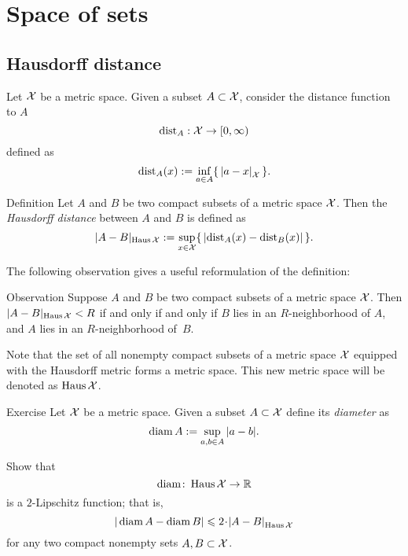 \chapter{Space of sets}

\section{Hausdorff distance}

Let $\mathcal{X}$ be a metric space.
Given a subset $A\subset \mathcal{X}$,
consider the distance function to $A$
$$\mathrm{dist}_A: \mathcal{X} \to [0,\infty)$$
defined as 
$$\distfun_A(x)
\df
\inf_{a\in A}\{\,\dist ax{\spc{X}}\,\}.$$

\begin{thm}{Definition}\label{def:hausdorff-convergence}
Let $A$ and $B$ be two compact subsets of a metric space $\mathcal{X}$.
Then the \emph{Hausdorff distance} between $A$ and $B$ is defined as 
$$|A-B|_{\operatorname{\rm Haus}\nolimits\mathcal{X}}
\mathrel{:=}
\sup_{x\in \mathcal{X}}\{\,|\mathrm{dist}_A(x)-\mathrm{dist}_B(x)|\,\}.
$$

\end{thm}

The following observation gives a useful reformulation of the definition:

\begin{thm}{Observation}\label{obs:Haus-nbhds}
Suppose $A$ and $B$ be two compact subsets of a metric space $\mathcal{X}$.
Then $|A-B|_{\operatorname{\rm Haus}\nolimits\mathcal{X}}< R$ if and only if and only if 
$B$ lies in an $R$-neighborhood of $A$, 
and 
$A$ lies in an $R$-neighborhood of~$B$.
\end{thm}



Note that the set of all nonempty compact subsets of a metric space $\mathcal{X}$ equipped with the Hausdorff metric forms a metric space.
This new metric space will be denoted as $\operatorname{\rm Haus}\nolimits\mathcal{X}$.

\begin{thm}{Exercise}\label{ex:diam}
Let $\mathcal{X}$ be a metric space.
Given a subset $A\subset \mathcal{X}$ define its \emph{diameter} as 
$$\operatorname{\rm diam}\nolimits A\mathrel{:=}\sup_{a,b\in A} |a-b|.$$

Show that 
$$\operatorname{\rm diam}\nolimits\colon\operatorname{\rm Haus}\nolimits\mathcal{X}\to \mathbb{R}$$ 
is a $2$-Lipschitz function;
that is,
\[|\diam A-\diam B|\le 2\cdot\dist{A}{B}{\Haus\spc{X}}\]
for any two compact nonempty sets $A,B\subset\mathcal{X}$.
\end{thm}


